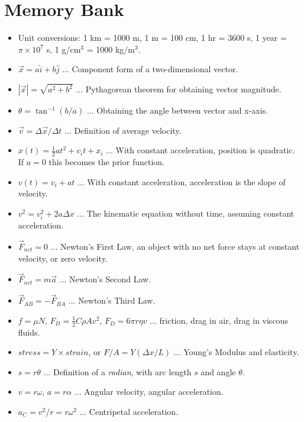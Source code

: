 \documentclass[10pt]{article}
\begin{document}
\maketitle

\section{Memory Bank}

\begin{itemize}
\item Unit conversions: 1 km = 1000 m, 1 m = 100 cm, 1 hr = 3600 s, 1 year = $\pi \times 10^7$ s, 1 g/cm$^3$ = 1000 kg/m$^3$.
\item $\vec{x} = a \hat{i} + b\hat{j}$ ... Component form of a two-dimensional vector.
\item $|\vec{x}| = \sqrt{a^2+b^2}$ ... Pythagorean theorem for obtaining vector magnitude.
\item $\theta = \tan^{-1}(b/a)$ ... Obtaining the angle between vector and x-axis.
\item $\vec{v} = \Delta\vec{x}/\Delta t$ ... Definition of average velocity.
\item $x(t) = \frac{1}{2} a t^2 + v_i t + x_i$ ... With constant acceleration, position is quadratic.  If $a=0$ this becomes the prior function.
\item $v(t) = v_i + a t$ ... With constant acceleration, acceleration is the slope of velocity.
\item $v^2 = v_i^2 + 2 a \Delta x$ ... The kinematic equation without time, assuming constant acceleration.
\item $\vec{F}_{net} = 0$ ... Newton's First Law, an object with no net force stays at constant velocity, or zero velocity.
\item $\vec{F}_{net} = m\vec{a}$ ... Newton's Second Law.
\item $\vec{F}_{AB} = -\vec{F}_{BA}$ ... Newton's Third Law.
\item $f = \mu N$, $F_D = \frac{1}{2}C\rho A v^2$, $F_D = 6\pi r \eta v$ ... friction, drag in air, drag in viscous fluids.
\item $stress = Y \times strain$, or $F/A = Y (\Delta x / L)$ ... Young's Modulus and elasticity.
\item $s = r \theta$ ... Definition of a \textit{radian}, with arc length $s$ and angle $\theta$.
\item $v = r\omega$, $a = r\alpha$ ... Angular velocity, angular acceleration.
\item $a_C = v^2/r = r\omega^2$ ... Centripetal acceleration.

\end{itemize}
\end{document}
